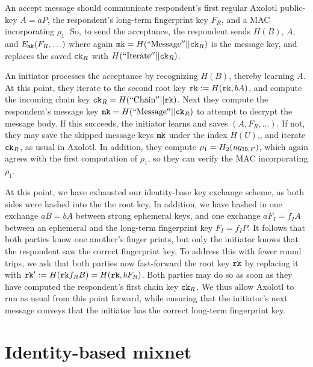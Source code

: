\documentclass[twoside,letterpaper]{sig-alternate}
\begin{document}
An accept message should communicate 
 respondent's first regular Axolotl public-key $A = a P$,
 the respondent's long-term fingerprint key $F_R$, and
 a MAC incorporating $\rho_1$.
So, to send the acceptance, the respondent
sends $H(B)$, $A$, and $E_{\mathtt{mk}}(F_R,\ldots)$ where again
 $\mathtt{mk} = H(\mathrm{``Message''}  || \mathtt{ck}_R)$ is the message key,
and replaces the saved $\mathtt{ck}_R$ with $H(\mathrm{``Iterate''} || \mathtt{ck}_R)$.

\smallskip

An initiator processes the acceptance by recognizing $H(B)$,
 thereby learning $A$.
At this point, they iterate to the second root key
 $\mathtt{rk} := H(\mathtt{rk}, b A )$, and
compute the incoming chain key $\mathtt{ck}_R = H(\mathrm{``Chain''} || \mathtt{rk})$.
Next they compute the respondent's
 message key $\mathtt{mk} = H(\mathrm{``Message''}  || \mathtt{ck}_R)$
to attempt to decrypt the message body.
If this succeeds, the initiator learns and saves $(A,F_R,\ldots)$.
If not, they may save the skipped message keys $\mathtt{mk}$ under the index $H(U)$,,
and iterate $\mathtt{ck}_R$, as usual in Axolotl.
In addition, they compute $\rho_1 = H_2( u g_{\mathtt{ID},F} )$,
 which again agrees with the first computation of $\rho_1$,
so they can verify the MAC  incorporating $\rho_1$.

\smallskip







At this point, we have exhausted our identity-base key exchange scheme,
 as both sides were hashed into the the root key.  In addition, we have
hashed in one exchange $a B = b A$ between strong ephemeral keys, and
one exchange $a F_I = f_I A$ between an ephemeral and
 the long-term fingerprint key $F_I = f_I P$.
It follows that both parties know one another's finger prints, but only
the initiator knows that the respondent saw the correct fingerprint key.
To address this with fewer round trips, we ask that both parties
now fast-forward the root key $\mathtt{rk}$ by replacing it with
 $\mathtt{rk}' := H(\mathtt{rk} f_R B) = H(\mathtt{rk}, b F_R )$.
Both parties may do so as soon as they have computed the respondent's
 first chain key $\mathtt{ck}_R$.
We thus allow Axolotl to run as usual from this point forward, while
ensuring that the initiator's next message conveys that the initiator
 has the correct long-term fingerprint key.


\section{Identity-based mixnet} %
\end{document}
